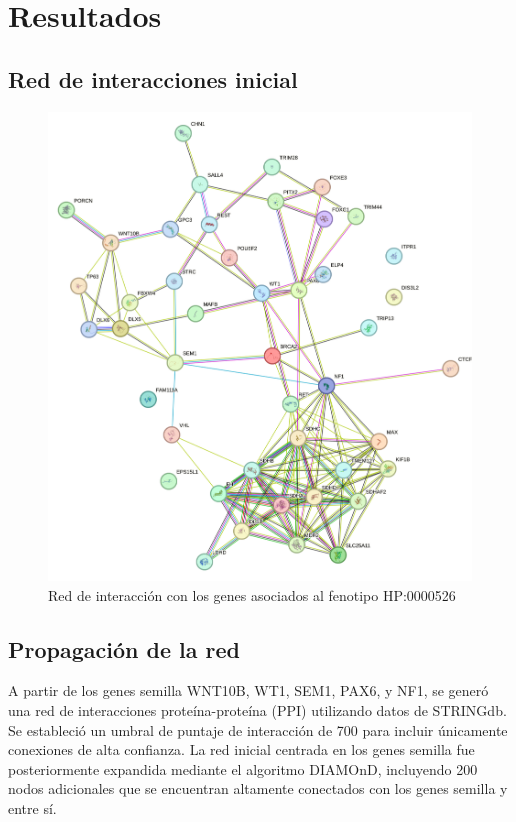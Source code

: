 \section{Resultados}

\subsection{Red de interacciones inicial}


\begin{figure}[h] %
	\centering
	\includegraphics[width=1\textwidth]{figures/red_interaccion_aniridia.png} %
	\caption{Red de interacción con los genes asociados al fenotipo HP:0000526} %
	\label{fig:mi-imagen} %
\end{figure}

\subsection{Propagación de la red}

A partir de los genes semilla WNT10B, WT1, SEM1, PAX6, y NF1, se generó una red de interacciones proteína-proteína (PPI) utilizando datos de STRINGdb. Se estableció un umbral de puntaje de interacción de 700 para incluir únicamente conexiones de alta confianza. La red inicial centrada en los genes semilla fue posteriormente expandida mediante el algoritmo DIAMOnD, incluyendo 200 nodos adicionales que se encuentran altamente conectados con los genes semilla y entre sí.

